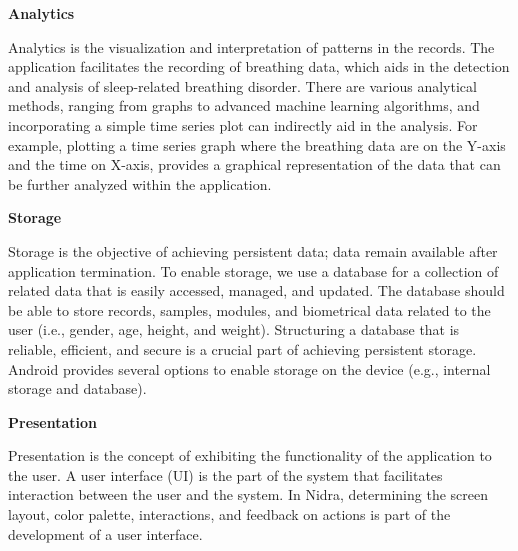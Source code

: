 \noindent \textbf{Analytics}

\noindent Analytics is the visualization and interpretation of patterns in the records. The application facilitates the recording of breathing data, which aids in the detection and analysis of sleep-related breathing disorder. There are various analytical methods, ranging from graphs to advanced machine learning algorithms, and incorporating a simple time series plot can indirectly aid in the analysis. For example, plotting a time series graph where the breathing data are on the Y-axis and the time on X-axis, provides a graphical representation of the data that can be further analyzed within the application.

\noindent \textbf{Storage}

\noindent Storage is the objective of achieving persistent data; data remain available after application termination. To enable storage, we use a database for a collection of related data that is easily accessed, managed, and updated. The database should be able to store records, samples, modules, and biometrical data related to the user (i.e., gender, age, height, and weight). Structuring a database that is reliable, efficient, and secure is a crucial part of achieving persistent storage. Android provides several options to enable storage on the device (e.g., internal storage and database).

\noindent \textbf{Presentation}

\noindent Presentation is the concept of exhibiting the functionality of the application to the user. A user interface (UI) is the part of the system that facilitates interaction between the user and the system. In Nidra, determining the screen layout, color palette, interactions, and feedback on actions is part of the development of a user interface. 